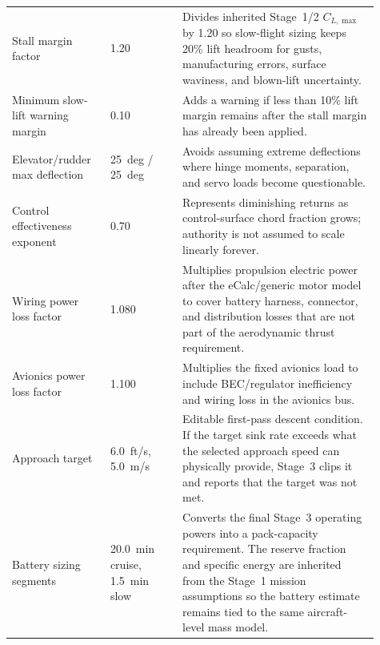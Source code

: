 \documentclass[11pt]{article}
\begin{document}
\begin{longtable}{@{}p{0.24\linewidth}p{0.18\linewidth}p{0.49\linewidth}@{}}
Stall margin factor & 1.20 & Divides inherited Stage~1/2 \(C_{L,\max}\) by 1.20 so slow-flight sizing keeps 20\% lift headroom for gusts, manufacturing errors, surface waviness, and blown-lift uncertainty. \\
Minimum slow-lift warning margin & 0.10 & Adds a warning if less than 10\% lift margin remains after the stall margin has already been applied. \\
Elevator/rudder max deflection & \SI{25}{deg} / \SI{25}{deg} & Avoids assuming extreme deflections where hinge moments, separation, and servo loads become questionable. \\
Control effectiveness exponent & 0.70 & Represents diminishing returns as control-surface chord fraction grows; authority is not assumed to scale linearly forever. \\
Wiring power loss factor & 1.080 & Multiplies propulsion electric power after the eCalc/generic motor model to cover battery harness, connector, and distribution losses that are not part of the aerodynamic thrust requirement. \\
Avionics power loss factor & 1.100 & Multiplies the fixed avionics load to include BEC/regulator inefficiency and wiring loss in the avionics bus. \\
Approach target & \SI{6.0}{ft/s}, \SI{5.0}{m/s} & Editable first-pass descent condition. If the target sink rate exceeds what the selected approach speed can physically provide, Stage~3 clips it and reports that the target was not met. \\
Battery sizing segments & \SI{20.0}{min} cruise, \SI{1.5}{min} slow & Converts the final Stage~3 operating powers into a pack-capacity requirement. The reserve fraction and specific energy are inherited from the Stage~1 mission assumptions so the battery estimate remains tied to the same aircraft-level mass model. \\
\bottomrule
\end{longtable}
\end{document}
